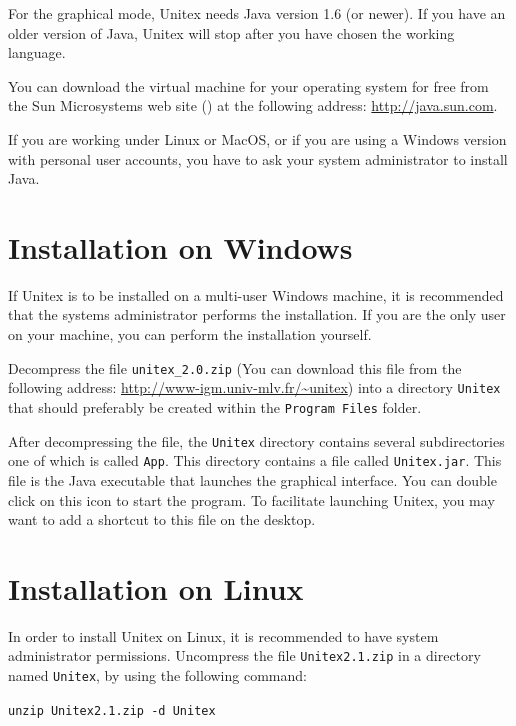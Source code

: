 \bigskip
\noindent For the graphical mode, Unitex needs Java version 1.6 (or newer). If you have an
older version of Java, Unitex will stop after you have chosen the working
language.

\bigskip
\noindent You can download the virtual machine for your operating system for free from the
Sun Microsystems web site (\cite{site-java}) at the following address:
\url{http://java.sun.com}.

\bigskip
\noindent If you are working under Linux or MacOS, or if you are using a Windows version
with personal user accounts, you have to ask your system administrator to install
Java.


\section{Installation on Windows}
If Unitex is to be installed on a multi-user Windows machine, it is recommended
that the systems administrator performs the installation. If you are the only
user on your machine, you can perform the installation  yourself.

\bigskip
\noindent Decompress the file  \verb+unitex_2.0.zip+ (You
can download this file from the following address:
\url{http://www-igm.univ-mlv.fr/~unitex}) into a directory \verb+Unitex+ that
should preferably be created within the \verb+Program Files+ folder.

\bigskip
\noindent After decompressing the file, the \verb+Unitex+ directory contains several
subdirectories  one  of which is called \verb+App+. This directory contains a
file called \verb+Unitex.jar+.  This file is the
Java executable that launches the graphical interface. You can double click on
this icon to start the program. To facilitate launching Unitex, you may want to
add a shortcut to this file on the desktop.




\section{Installation on Linux}
In order to install Unitex on Linux, it is recommended to have system
administrator permissions. Uncompress the file \verb+Unitex2.1.zip+ in a
directory named \verb+Unitex+, by using the following command:

\bigskip \noindent \verb$unzip Unitex2.1.zip -d Unitex$

